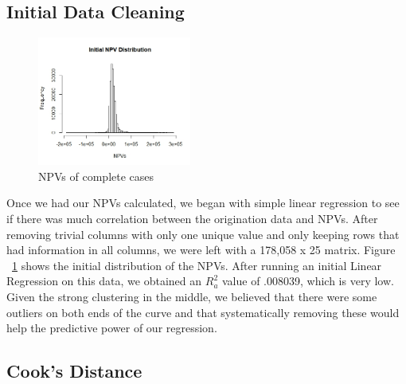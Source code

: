 \documentclass[12 pt]{uncw_thesis}
\theoremstyle{plain}
\theoremstyle{remark}
\theoremstyle{definition}
\begin{document}
\subsection{Initial Data Cleaning}
\begin{figure}
	\vspace{-2cm}
	\centering
	\includegraphics[width=0.45\textwidth]{images/InitalNPVs.jpeg}
	\caption{NPVs of complete cases}
	\label{fig:InitialNPVs}
\end{figure}
Once we had our NPVs calculated, we began with simple linear regression to see if there was much correlation between the origination data and NPVs. After removing trivial columns with only  one unique value and only keeping rows that had information in all columns, we were left with a 178,058 x 25 matrix. Figure ~\ref{fig:InitialNPVs} shows the initial distribution of the NPVs.  After running an initial Linear Regression on this data, we obtained an \(R_a^2\) value of .008039, which is very low. Given the strong clustering in the middle, we believed that there were some outliers on both ends of the curve and that systematically removing these would help the predictive power of our regression. 
\subsection{Cook's Distance}
\end{document}
